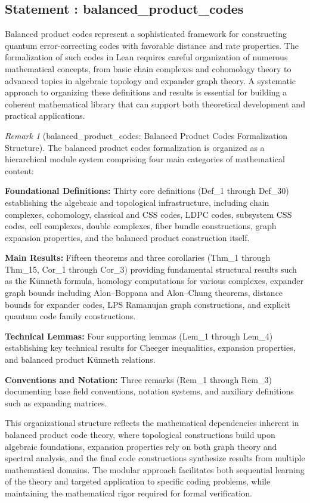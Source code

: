 \documentclass[11pt]{article}
\theoremstyle{plain}
\theoremstyle{definition}
\theoremstyle{remark}
\newtheorem*{remark}{Remark}
\begin{document}
\vspace{1em}

\subsection{Statement : balanced\_product\_codes}

Balanced product codes represent a sophisticated framework for constructing quantum error-correcting codes with favorable distance and rate properties. The formalization of such codes in Lean requires careful organization of numerous mathematical concepts, from basic chain complexes and cohomology theory to advanced topics in algebraic topology and expander graph theory. A systematic approach to organizing these definitions and results is essential for building a coherent mathematical library that can support both theoretical development and practical applications.

\begin{remark}[balanced\_product\_codes: Balanced Product Codes Formalization Structure]
The balanced product codes formalization is organized as a hierarchical module system comprising four main categories of mathematical content:

\textbf{Foundational Definitions:} Thirty core definitions (Def\_1 through Def\_30) establishing the algebraic and topological infrastructure, including chain complexes, cohomology, classical and CSS codes, LDPC codes, subsystem CSS codes, cell complexes, double complexes, fiber bundle constructions, graph expansion properties, and the balanced product construction itself.

\textbf{Main Results:} Fifteen theorems and three corollaries (Thm\_1 through Thm\_15, Cor\_1 through Cor\_3) providing fundamental structural results such as the K\"{u}nneth formula, homology computations for various complexes, expander graph bounds including Alon--Boppana and Alon--Chung theorems, distance bounds for expander codes, LPS Ramanujan graph constructions, and explicit quantum code family constructions.

\textbf{Technical Lemmas:} Four supporting lemmas (Lem\_1 through Lem\_4) establishing key technical results for Cheeger inequalities, expansion properties, and balanced product K\"{u}nneth relations.

\textbf{Conventions and Notation:} Three remarks (Rem\_1 through Rem\_3) documenting base field conventions, notation systems, and auxiliary definitions such as expanding matrices.
\end{remark}

This organizational structure reflects the mathematical dependencies inherent in balanced product code theory, where topological constructions build upon algebraic foundations, expansion properties rely on both graph theory and spectral analysis, and the final code constructions synthesize results from multiple mathematical domains. The modular approach facilitates both sequential learning of the theory and targeted application to specific coding problems, while maintaining the mathematical rigor required for formal verification.

\vspace{1em}
\end{document}
